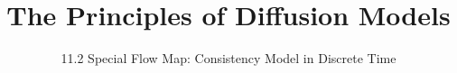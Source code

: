 ﻿%

\title{The Principles of Diffusion Models}
\subtitle{11.2 Special Flow Map: Consistency Model in Discrete Time}


\begin{frame}
    \titlepage
\end{frame}


